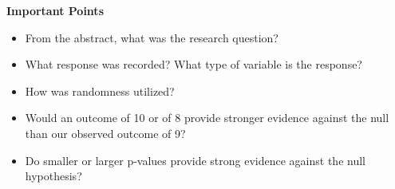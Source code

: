  \begin{center}
   {\large\bf Important Points}
 \end{center}
 \begin{itemize}
 \item From the abstract, what was the research question?\vspace{1cm}
 \item What response was recorded? What type of variable is the
   response? \vspace{1cm}
 \item How was randomness utilized?\vspace{1cm}
 \item Would an outcome of 10 or of 8 provide stronger evidence
   against the null than our observed outcome of 9?\vfill
 \item Do smaller or larger p-values provide strong evidence against
   the null hypothesis? 
 \end{itemize}



